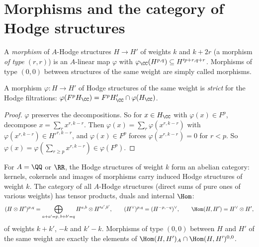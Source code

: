 \section{Morphisms and the category of Hodge structures}\label{hodge-structures:section-category}

\begin{definition}\label{hodge-structures:definition-morphism}
A \emph{morphism} of $A$-Hodge structures $H \to H'$ of weights $k$ and $k + 2r$ (a morphism \emph{of type $(r, r)$}) is an $A$-linear map $\varphi$ with
$\varphi_\CC(H^{p,q}) \subseteq H'^{p+r,q+r}$. Morphisms of type $(0,0)$ between structures of the same weight are simply called morphisms.
\end{definition}

\begin{proposition}\label{hodge-structures:proposition-strict}
A morphism $\varphi \colon H \to H'$ of Hodge structures of the same weight is \emph{strict} for the Hodge filtrations: $\varphi(F^pH_\CC) = F^pH'_\CC \cap \varphi(H_\CC)$.
\end{proposition}

\begin{proof}
$\varphi$ preserves the decompositions. So for $x \in H_\CC$ with $\varphi(x) \in F^p$, decompose $x = \sum_rx^{r,k-r}$. Then $\varphi(x) = \sum_r\varphi(x^{r,k-r})$ with $\varphi(x^{r,k-r}) \in H'^{r,k-r}$, and
$\varphi(x) \in F^p$ forces $\varphi(x^{r,k-r}) = 0$ for $r < p$. So $\varphi(x) = \varphi(\sum_{r \geq p}x^{r,k-r}) \in \varphi(F^p)$.
\end{proof}

\begin{theorem}\label{hodge-structures:theorem-abelian}
For $A = \QQ$ or $\RR$, the Hodge structures of weight $k$ form an abelian category: kernels, cokernels and images of morphisms carry induced Hodge structures of weight $k$. The
category of all $A$-Hodge structures (direct sums of pure ones of various weights) has tensor products, duals and internal $\Hom$:
\[
(H \otimes H')^{p,q} = \bigoplus_{a+a'=p,\,b+b'=q}H^{a,b} \otimes H'^{a',b'}, \qquad (H^\vee)^{p,q} = (H^{-p,-q})^\vee, \qquad \Hom(H, H') = H^\vee \otimes H',
\]
of weights $k + k'$, $-k$ and $k' - k$. Morphisms of type $(0,0)$ between $H$ and $H'$ of the same weight are exactly the elements of $\Hom(H, H')_A \cap \Hom(H, H')^{0,0}$.
\end{theorem}

